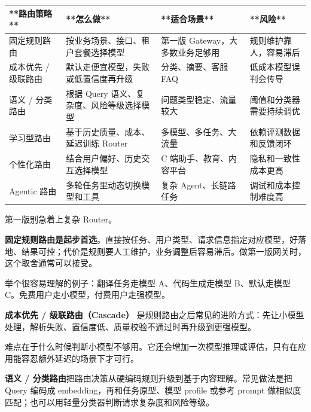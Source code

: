 \documentclass[9pt,a4paper,twocolumn]{ctexart}
\begin{document}
{\footnotesize
\begin{tabular}{|p{}|p{}|p{}|p{}|}
\hline
\textbf{**路由策略**} & \textbf{**怎么做**} & \textbf{**适合场景**} & \textbf{**风险**} \\
\hline
固定规则路由 & 按业务场景、接口、租户套餐选择模型 & 第一版 Gateway，大多数业务足够用 & 规则维护靠人，容易滞后 \\
\hline
成本优先 / 级联路由 & 默认走便宜模型，失败或低置信度再升级 & 分类、摘要、客服 FAQ & 低成本模型误判会传导 \\
\hline
语义 / 分类路由 & 根据 Query 语义、复杂度、风险等级选择模型 & 问题类型稳定、流量较大 & 阈值和分类器需要持续调优 \\
\hline
学习型路由 & 基于历史质量、成本、延迟训练 Router & 多模型、多任务、大流量 & 依赖评测数据和反馈闭环 \\
\hline
个性化路由 & 结合用户偏好、历史交互选择模型 & C 端助手、教育、内容平台 & 隐私和一致性成本更高 \\
\hline
Agentic 路由 & 多轮任务里动态切换模型和工具 & 复杂 Agent、长链路任务 & 调试和成本控制难度高 \\
\hline
\end{tabular}
}



第一版别急着上复杂 Router。



\textbf{固定规则路由是起步首选}。直接按任务、用户类型、请求信息指定对应模型，好落地、结果可控；代价是规则要人工维护，业务调整后容易滞后。做第一版网关时，这个取舍通常可以接受。



举个很容易理解的例子：翻译任务走模型 A、代码生成走模型 B、默认走模型 C。免费用户走小模型，付费用户走强模型。



\textbf{成本优先 / 级联路由（Cascade）} 是规则路由之后常见的进阶方式：先让小模型处理，解析失败、置信度低、质量校验不通过时再升级到更强模型。



难点在于什么时候判断小模型不够用。它还会增加一次模型推理或评估，只有在应用能容忍额外延迟的场景下才可行。



\textbf{语义 / 分类路由}把路由决策从硬编码规则升级到基于内容理解。常见做法是把 Query 编码成 embedding，再和任务原型、模型 profile 或参考 prompt 做相似度匹配；也可以用轻量分类器判断请求复杂度和风险等级。
\end{document}
